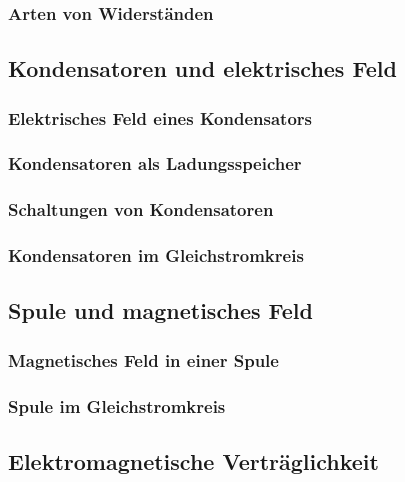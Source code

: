 \subsubsection{Arten von Widerständen}

\subsection{Kondensatoren und elektrisches Feld}
\subsubsection{Elektrisches Feld eines Kondensators}
\subsubsection{Kondensatoren als Ladungsspeicher}
\subsubsection{Schaltungen von Kondensatoren}
\subsubsection{Kondensatoren im Gleichstromkreis}

\subsection{Spule und magnetisches Feld}
\subsubsection{Magnetisches Feld in einer Spule}
\subsubsection{Spule im Gleichstromkreis}

\subsection{Elektromagnetische Verträglichkeit}

